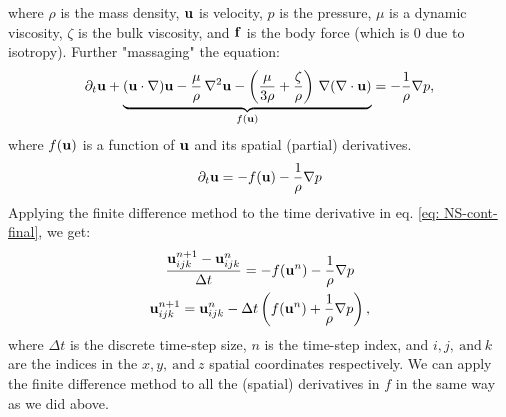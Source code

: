 where $\rho$ is the mass density, $\mathbf{u}$ is velocity, $p$ is the pressure, $\mu$ is a dynamic viscosity, $\zeta$ is the bulk viscosity, and $\mathbf{f}$ is the body force (which is 0 due to isotropy).
Further "massaging" the equation:
\begin{gather}
    \partial_t \mathbf{u} + \underbrace{(\mathbf {u} \cdot \nabla) \mathbf{u} -\frac{\mu}{\rho} \,\nabla ^{2}\mathbf{u}-\left(\frac{\mu}{3\rho} +\frac{\zeta}{\rho} \right)\,\nabla (\nabla \cdot \mathbf{u})}_{f\left(\mathbf{u}\right)} =-{\frac {1}{\rho }}\nabla p,
\end{gather}
where $f(\mathbf{u})$ is a function of $\mathbf{u}$ and its spatial (partial) derivatives.
\begin{gather}
    \partial_t \mathbf{u}  = -f(\mathbf{u}) -{\frac {1}{\rho }}\nabla p \label{eq: NS-cont-final}
\end{gather}
Applying the finite difference method to the time derivative in eq. \ref{eq: NS-cont-final}, we get:
\begin{gather}
    \frac{\mathbf{u}_{ijk}^{n+1} - \mathbf{u}_{ijk}^n}{\Delta t} = -f(\mathbf{u}^n) -{\frac {1}{\rho }}\nabla p \\
    \mathbf{u}_{ijk}^{n+1} = \mathbf{u}_{ijk}^n - \Delta t \left(f(\mathbf{u}^n) + {\frac {1}{\rho }}\nabla p\right), \label{eq: NS-fd}
\end{gather}
where $\Delta t$ is the discrete time-step size, $n$ is the time-step index, and $i,j,~\text{and}~k$ are the indices in the $x,y,~\text{and}~z$ spatial coordinates respectively. We can apply the finite difference method to all the (spatial) derivatives in $f$ in the same way as we did above.

